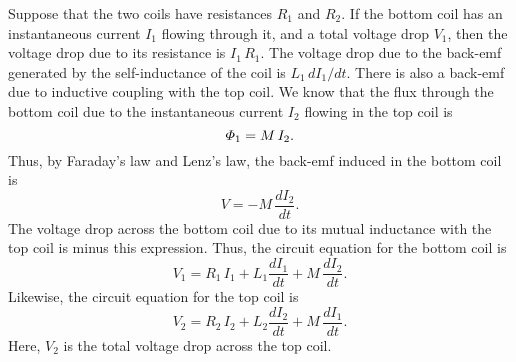 Suppose that the two coils have resistances $R_1$ and $R_2$. If the bottom coil
has an instantaneous  current $I_1$ flowing through it, and a total voltage drop
$V_1$,  then the voltage drop due to its resistance is $I_1 \,R_1$. The voltage drop
due to the back-emf generated by the self-inductance of the coil is
$L_1\, d I_1/dt$. There is also a back-emf due to inductive coupling with
the top coil. We know that the flux through the bottom coil due to the instantaneous
current $I_2$ flowing in the top coil is
\begin{equation}
{\mit\Phi}_1 = M \,I_2.
\end{equation}
Thus, by Faraday's law and Lenz's law, the  back-emf induced in the bottom
coil is
\begin{equation}
V = - M \,\frac{dI_2}{dt}.
\end{equation}
The voltage drop across the bottom coil due to its mutual inductance with the
top coil is minus this expression. Thus, the circuit equation for the bottom coil is
\begin{equation}
V_1 = R_1\, I_1 + L_1 \frac{dI_1}{dt} + M\,\frac{dI_2}{dt}.
\end{equation}
Likewise, the circuit equation for the top coil is
\begin{equation}
V_2 = R_2 \,I_2 + L_2 \frac{d I_2}{dt} + M\,\frac{d I_1}{dt}.
\end{equation}
Here, $V_2$ is the total voltage drop across the top coil. 


